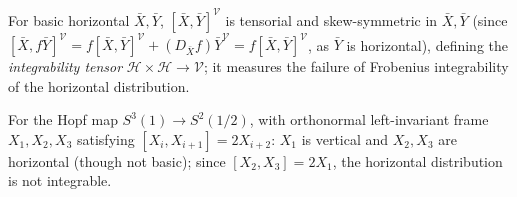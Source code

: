 \begin{definition}
  \label{def:pet-ch4-integrability-tensor}
  For basic horizontal $\bar X,\bar Y$, $[\bar X,\bar Y]^{\mathcal V}$ is
  tensorial and skew-symmetric in $\bar X,\bar Y$ (since
  $[\bar X,f\bar Y]^{\mathcal V}=f[\bar X,\bar Y]^{\mathcal V}+(D_{\bar X}f)\bar Y^{\mathcal V}=f[\bar X,\bar Y]^{\mathcal V}$,
  as $\bar Y$ is horizontal), defining the \emph{integrability tensor}
  $\mathcal H\times\mathcal H\to\mathcal V$; it measures the failure of
  Frobenius integrability of the horizontal distribution.
\end{definition}

\begin{example}
  \label{ex:pet-ch4-hopf-integrability}
  For the Hopf map $S^3(1)\to S^2(1/2)$, with orthonormal left-invariant frame
  $X_1,X_2,X_3$ satisfying $[X_i,X_{i+1}]=2X_{i+2}$: $X_1$ is vertical and
  $X_2,X_3$ are horizontal (though not basic); since $[X_2,X_3]=2X_1$, the
  horizontal distribution is not integrable.
\end{example}

